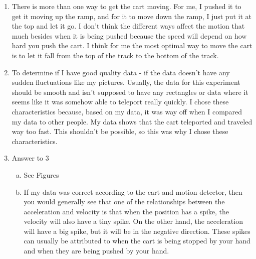 \documentclass[idxtotoc,hyperref,openany]{labbook} %
\begin{document}

\begin{enumerate}
    \item There is more than one way to get the cart moving. For me, I pushed it to get it moving up the ramp, and for it to move down the ramp, I just put it at the top and let it go. I don't think the different ways affect the motion that much besides when it is being pushed because the speed will depend on how hard you push the cart. I think for me the most optimal way to move the cart is to let it fall from the top of the track to the bottom of the track.
    \item To determine if I have good quality data - if the data doesn't have any sudden fluctuations like my pictures. Usually, the data for this experiment should be smooth and isn't supposed to have any rectangles or data where it seems like it was somehow able to teleport really quickly. I chose these characteristics because, based on my data, it was way off when I compared my data to other people. My data shows that the cart teleported and traveled way too fast. This shouldn't be possible, so this was why I chose these characteristics.
    \item Answer to 3
    \begin{enumerate}[(a)]
        \item See Figures
        \item If my data was correct according to the cart and motion detector, then you would generally see that one of the relationships between the acceleration and velocity is that when the position has a spike, the velocity will also have a tiny spike. On the other hand, the acceleration will have a big spike, but it will be in the negative direction. These spikes can usually be attributed to when the cart is being stopped by your hand and when they are being pushed by your hand.
    \end{enumerate}
\end{enumerate}




\end{document}
